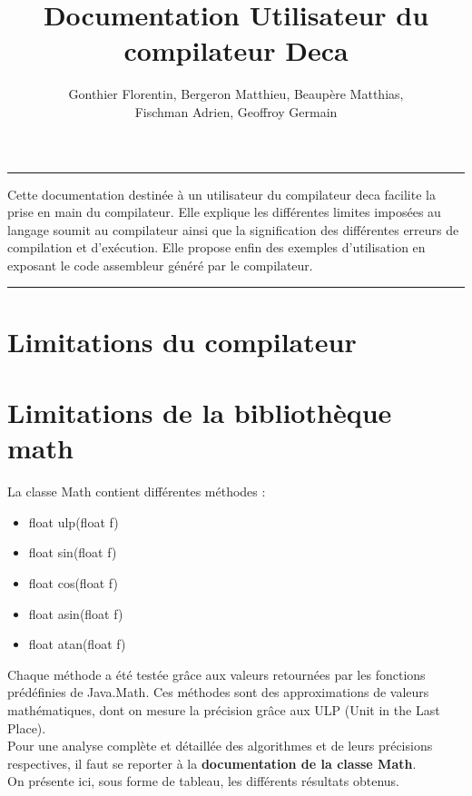 \documentclass[a4,12pt]{article}
\begin{document}
\begin{titlepage}
\title{ Documentation Utilisateur du compilateur Deca}
\author{Gonthier Florentin, Bergeron Matthieu, Beaupère Matthias,\\ Fischman Adrien, Geoffroy Germain}
\date{}

\maketitle

\rule[0.5ex]{\textwidth}{0.2mm}
Cette documentation destinée à un utilisateur du compilateur deca facilite la prise en main du compilateur.
Elle explique les différentes limites imposées au langage soumit au compilateur ainsi que la signification des
différentes erreurs de compilation et d'exécution. Elle propose enfin des exemples d'utilisation en exposant
le code assembleur généré par le compilateur.

\rule[0.5ex]{\textwidth}{0.2mm}

\end{titlepage}
\tableofcontents
\newpage

\section{Limitations du compilateur}

\section{Limitations de la bibliothèque math}
La classe Math contient différentes méthodes :
\begin{itemize}
    \item float ulp(float f)
    \item float sin(float f)
    \item float cos(float f)
    \item float asin(float f)
    \item float atan(float f)
\end{itemize}
Chaque méthode a été testée grâce aux valeurs retournées par les fonctions prédéfinies de Java.Math. Ces méthodes sont des approximations de valeurs mathématiques, dont on mesure la précision grâce aux ULP (Unit in the Last Place).\\
Pour une analyse complète et détaillée des algorithmes et de leurs précisions respectives, il faut se reporter à la \textbf{documentation de la classe Math}. \\
On présente ici, sous forme de tableau, les différents résultats obtenus.
\end{document}
